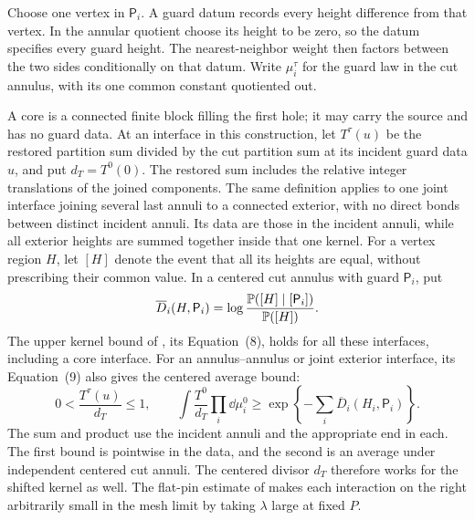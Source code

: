 Choose one vertex in \(\mathsf P_i\).  A guard datum records every
height difference from that vertex.  In the annular quotient choose
its height to be zero, so the datum specifies every guard height.
The nearest-neighbor weight then factors between the two sides
conditionally on that datum.  Write \(\mu_i^\tau\) for the guard law
in the cut annulus, with its one common constant quotiented out.

A core is a connected finite block filling the first hole; it may
carry the source and has no guard data.
At an interface in this construction, let \(T^\tau(u)\) be the restored
partition sum divided by the cut partition sum at its incident guard
data \(u\),
and put \(d_T=T^0(0)\).  The restored sum includes the relative
integer translations of the joined components.  The same definition
applies to one joint interface joining several last annuli to a
connected exterior, with no direct bonds between distinct incident
annuli.  Its data are those in the incident annuli, while all exterior
heights are summed together inside that one kernel.
For a vertex region \(H\), let \([H]\) denote the event that all its
heights are equal, without prescribing their common value.  In a
centered cut annulus with guard \(\mathsf P_i\), put
\[
 \overline D_i(H,\mathsf P_i)
   =\log\frac{\mathbb P([H]\mid[\mathsf P_i])}{\mathbb P([H])}.
\]
The upper kernel bound of \cite[Lemma~5.1]{S}, its Equation~(8), holds
for all these interfaces, including a core interface.  For an
annulus--annulus or joint exterior interface, its Equation~(9) also
gives the centered average bound:
\begin{equation}\label{geo:kernel-bounds}
 0<\frac{T^\tau(u)}{d_T}\le1,
 \qquad
 \int\frac{T^0}{d_T}\prod_i\dd\mu_i^0
       \ge \exp\left\{-\sum_i\overline D_i(H_i,\mathsf P_i)\right\}.
\end{equation}
The sum and product use the incident annuli and the appropriate end
in each.  The first bound is pointwise in the data, and the second
is an average under independent centered cut annuli.  The centered
divisor \(d_T\) therefore works for the shifted kernel as well.
The flat-pin estimate of \cite[Proposition~4.1]{S}
makes each interaction on the right arbitrarily small in the mesh
limit by taking \(\lambda\) large at fixed \(P\).

